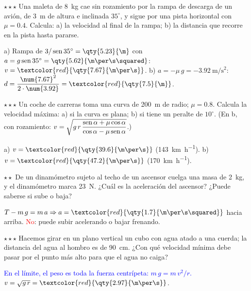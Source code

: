 \begin{exercise}
    \(\star\star\star\) Una maleta de \qty{8}{\kg} cae sin rozamiento por la rampa de descarga de un avión, de \qty{3}{\m} de altura e
    inclinada \(35^\circ\), y sigue por una pista horizontal con \(\mu = \num{0.4}\). Calcula: a) la velocidad al final de la rampa; b) la
    distancia que recorre en la pista hasta pararse.
    \begin{solu}
        a) Rampa de \(3/\sen 35^\circ = \qty{5.23}{\m}\) con \(a = g\sen 35^\circ = \qty{5.62}{\m\per\s\squared}\): \(v = \textcolor{red}{\qty{7.67}{\m\per\s}}\).
        b) \(a = -\mu\,g = \qty{-3.92}{\m\per\s\squared}\): \(d = \dfrac{\num{7.67}^2}{2 \cdot \num{3.92}} = \textcolor{red}{\qty{7.5}{\m}}\).
    \end{solu}
\end{exercise}

\begin{exercise}
    \(\star\star\star\) Un coche de carreras toma una curva de \qty{200}{\m} de radio; \(\mu = \num{0.8}\). Calcula la velocidad máxima:
    a) si la curva es plana; b) si tiene un peralte de \(10^\circ\). (En b, con rozamiento: \(v = \sqrt{g\,r\,\dfrac{\operatorname{sen}\alpha + \mu\cos\alpha}{\cos\alpha - \mu\operatorname{sen}\alpha}}\).)
    \begin{solu}
        a) \(v = \textcolor{red}{\qty{39.6}{\m\per\s}}\) (\qty{143}{\km\per\hour}). b) \(v = \textcolor{red}{\qty{47.2}{\m\per\s}}\) (\qty{170}{\km\per\hour}).
    \end{solu}
\end{exercise}

\begin{exercise}
    \(\star\star\) De un dinamómetro sujeto al techo de un ascensor cuelga una masa de \qty{2}{\kg}, y el dinamómetro marca
    \qty{23}{\newton}. ¿Cuál es la aceleración del ascensor? ¿Puede saberse si sube o baja?
    \begin{solu}
        \(T - m\,g = m\,a \Rightarrow a = \textcolor{red}{\qty{1.7}{\m\per\s\squared}}\) hacia arriba. \textcolor{red}{No}: puede subir
        acelerando o bajar frenando.
    \end{solu}
\end{exercise}

\begin{exercise}
    \(\star\star\star\) Hacemos girar en un plano vertical un cubo con agua atado a una cuerda; la distancia del agua al hombro es de
    \qty{90}{\cm}. ¿Con qué velocidad mínima debe pasar por el punto más alto para que el agua no caiga?
    \begin{solu}
        \textcolor{blue}{En el límite, el peso es toda la fuerza centrípeta: \(m\,g = m\,v^2/r\).} \(v = \sqrt{g\,r} = \textcolor{red}{\qty{2.97}{\m\per\s}}\).
    \end{solu}
\end{exercise}

